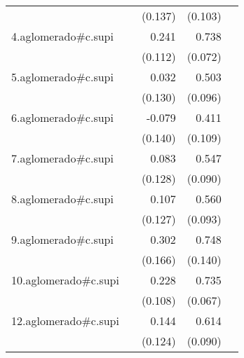 {\begin{longtable}{l*{4}{D{.}{.}{-1}}}
            &                     &     (0.137)         &     (0.103)         &                     \\
\addlinespace
4.aglomerado#c.supi&                     &       0.241\sym{*}  &       0.738\sym{***}&                     \\
            &                     &     (0.112)         &     (0.072)         &                     \\
\addlinespace
5.aglomerado#c.supi&                     &       0.032         &       0.503\sym{***}&                     \\
            &                     &     (0.130)         &     (0.096)         &                     \\
\addlinespace
6.aglomerado#c.supi&                     &      -0.079         &       0.411\sym{***}&                     \\
            &                     &     (0.140)         &     (0.109)         &                     \\
\addlinespace
7.aglomerado#c.supi&                     &       0.083         &       0.547\sym{***}&                     \\
            &                     &     (0.128)         &     (0.090)         &                     \\
\addlinespace
8.aglomerado#c.supi&                     &       0.107         &       0.560\sym{***}&                     \\
            &                     &     (0.127)         &     (0.093)         &                     \\
\addlinespace
9.aglomerado#c.supi&                     &       0.302         &       0.748\sym{***}&                     \\
            &                     &     (0.166)         &     (0.140)         &                     \\
\addlinespace
10.aglomerado#c.supi&                     &       0.228\sym{*}  &       0.735\sym{***}&                     \\
            &                     &     (0.108)         &     (0.067)         &                     \\
\addlinespace
12.aglomerado#c.supi&                     &       0.144         &       0.614\sym{***}&                     \\
            &                     &     (0.124)         &     (0.090)         &                     \\

\end{longtable}}
